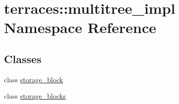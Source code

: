 \hypertarget{namespaceterraces_1_1multitree__impl}{}\section{terraces\+:\+:multitree\+\_\+impl Namespace Reference}
\label{namespaceterraces_1_1multitree__impl}
\subsection*{Classes}
\begin{DoxyCompactItemize}
\item 
class \hyperlink{classterraces_1_1multitree__impl_1_1storage__block}{storage\+\_\+block}
\item 
class \hyperlink{classterraces_1_1multitree__impl_1_1storage__blocks}{storage\+\_\+blocks}
\end{DoxyCompactItemize}
